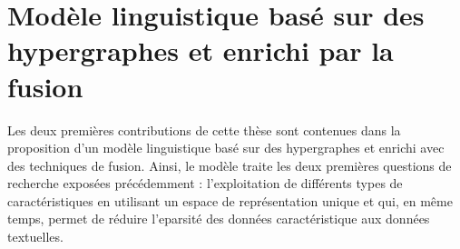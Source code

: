 \documentclass[a4paper,11pt,twoside]{article}
\begin{document}
\section{Modèle linguistique basé sur des hypergraphes et enrichi par la fusion}
%
%
%
%
%
%
%

Les deux premières contributions de cette thèse sont contenues dans la proposition d'un modèle linguistique basé sur des hypergraphes et enrichi avec des techniques de fusion. Ainsi, le modèle traite les deux premières questions de recherche exposées précédemment : l'exploitation de différents types de caractéristiques en utilisant un espace de représentation unique et qui, en même temps, permet de réduire l'eparsité des données caractéristique aux données textuelles.
\end{document}
